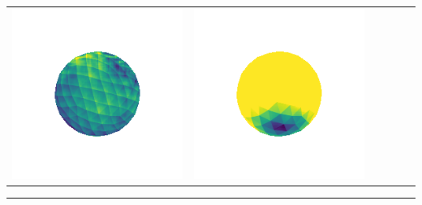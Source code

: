 \begin{tabularx}{\linewidth}{@{}Y@{}Y@{}Y@{}Y@{}Y@{}Y@{}}
\includegraphics[width=\linewidth]{semisynthetic/20160617_1_marrnet_err.png} &
\includegraphics[width=\linewidth]{semisynthetic/20160617_1_ef_err.png} \\
\end{tabularx}
\begin{center}\rule{0.5\linewidth}{\linethickness}\end{center}

